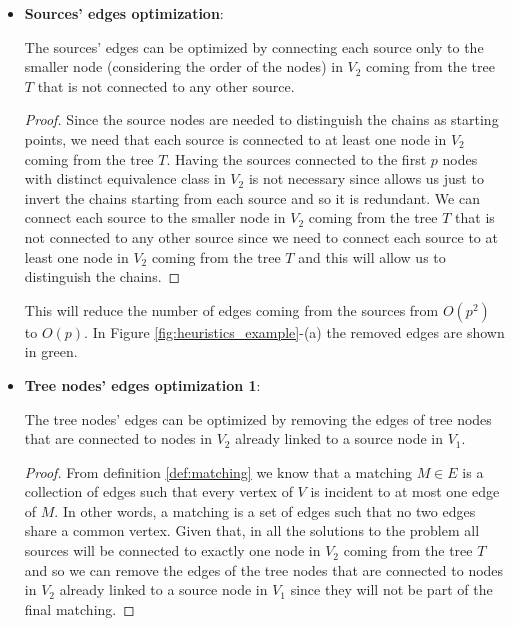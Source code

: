 \begin{itemize}
    \item \textbf{Sources' edges optimization}:
    \begin{lemma} \label{lemma:sources_optimization}
        The sources' edges can be optimized by connecting each source only to the smaller node (considering the order of the nodes) in $V_2$ coming from the tree $T$ that is not connected to any other source. 
    \end{lemma}

    \begin{proof}
        Since the source nodes are needed to distinguish the chains as starting points, we need that each source is connected to at least one node in $V_2$ coming from the tree $T$. Having the sources connected to the first $p$ nodes with distinct equivalence class in $V_2$ is not necessary since allows us just to invert the chains starting from each source and so it is redundant. We can connect each source to the smaller node in $V_2$ coming from the tree $T$ that is not connected to any other source since we need to connect each source to at least one node in $V_2$ coming from the tree $T$ and this will allow us to distinguish the chains.
    \end{proof}

    This will reduce the number of edges coming from the sources from $O(p^2)$ to $O(p)$. In Figure \ref{fig:heuristics_example}-(a) the removed edges are shown in green.
    \item \textbf{Tree nodes' edges optimization 1}: 
    \begin{lemma} \label{lemma:tree_optimization_1}
        The tree nodes' edges can be optimized by removing the edges of tree nodes that are connected to nodes in $V_2$ already linked to a source node in $V_1$. 
    \end{lemma}

    \begin{proof}
        From definition \ref{def:matching} we know that a matching $M \in E$ is a collection of edges such that every vertex of $V$ is incident to at most one edge of $M$. In other words, a matching is a set of edges such that no two edges share a common vertex. Given that, in all the solutions to the problem all sources will be connected to exactly one node in $V_2$ coming from the tree $T$ and so we can remove the edges of the tree nodes that are connected to nodes in $V_2$ already linked to a source node in $V_1$ since they will not be part of the final matching.
    \end{proof}


\end{itemize}
